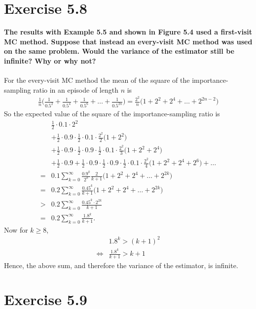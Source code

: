 \documentclass[a4paper,11pt]{article}
\numberwithin{equation}{section}
\theoremstyle{remark}
\begin{document}
\section{Exercise 5.8}

\textbf{The results with Example 5.5 and shown in Figure 5.4 used a first-visit MC method. Suppose that instead an every-visit MC method was used on the same problem. Would the variance of the estimator still be infinite? Why or why not?}
\\ \\
For the every-visit MC method the mean of the square of the importance-sampling ratio in an episode of length $n$ is
\begin{align*}
	\frac{1}{n} \Bigg( \frac{1}{0.5^2} + \frac{1}{0.5^4} + \frac{1}{0.5^6} + \dots + \frac{1}{0.5^{2n}} \Bigg) 
	= \frac{2^2}{n} \Big( 1 + 2^2 + 2^4 + \dots + 2^{2n-2} \Big) 
\end{align*}
So the expected value of the square of the importance-sampling ratio is 
\begin{align*}
& \frac{1}{2} \cdot 0.1 \cdot 2^2 \\
& + \frac{1}{2} \cdot 0.9 \cdot \frac{1}{2} \cdot 0.1 \cdot \frac{2^2}{2} \Big( 1 + 2^2 \Big) \\
& + \frac{1}{2} \cdot 0.9 \cdot \frac{1}{2} \cdot 0.9 \cdot \frac{1}{2} \cdot 0.1 \cdot \frac{2^2}{3} \Big( 1 + 2^2 + 2^4 \Big) \\
& + \frac{1}{2} \cdot 0.9 + \frac{1}{2} \cdot 0.9 \cdot \frac{1}{2} \cdot 0.9 \cdot \frac{1}{2} \cdot 0.1 \cdot \frac{2^2}{4} \Big( 1 + 2^2 + 2^4 + 2^6 \Big) + \dots \\
= & 0.1 \sum_{k=0}^{\infty} \frac{0.9^k}{2^k} \frac{2}{k+1} \Big( 1 + 2^2 + 2^4 + \dots + 2^{2k}  \Big) \\
= & 0.2 \sum_{k=0}^{\infty} \frac{0.45^k}{k+1} \Big( 1 + 2^2 + 2^4 + \dots + 2^{2k}  \Big) \\
> &  0.2 \sum_{k=0}^{\infty} \frac{0.45^k \cdot 2^{2k}}{k+1} \\ 
= &  0.2 \sum_{k=0}^{\infty} \frac{1.8^k}{k+1} . 
\end{align*}
Now for $k \geq 8$, 
\begin{align*}
	& 1.8^k > (k+1)^2 \\
	\iff & \frac{1.8^k}{k+1} > k+1
\end{align*}
Hence, the above sum, and therefore the variance of the estimator, is infinite. 

\section{Exercise 5.9}
\end{document}

